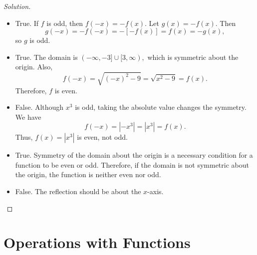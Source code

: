 \documentclass[12pt]{article}
\newenvironment{solution}{\begin{proof}[Solution]}{\end{proof}}
\begin{document}
\begin{enumerate}
\begin{solution}
\begin{itemize}
				\item[(d)] True. If $f$ is odd, then $f(-x)=-f(x)$. Let $g(x)=-f(x)$. Then
					$$g(-x)=-f(-x)=-[-f(x)]=f(x)=-g(x),	$$
					so $g$ is odd.
					
				\item[(e)] True. The domain is
					$(-\infty,-3]\cup[3,\infty),$
					which is symmetric about the origin. Also,
					$$f(-x)=\sqrt{(-x)^2-9}
					=\sqrt{x^2-9}
					=f(x).$$
					Therefore, $f$ is even.
					
				\item[(f)] False. Although $x^3$ is odd, taking the absolute value changes the symmetry. We have
					$$f(-x)=|-x^3|=|x^3|=f(x).$$
					Thus, $f(x)=|x^3|$ is even, not odd.
					
				\item[(g)] True. Symmetry of the domain about the origin is a necessary condition for a function to be even or odd. Therefore, if the domain is not symmetric about the origin, the function is neither even nor odd.
					
				\item[(h)] False. The reflection should be about the $x$-axis.
					
				
			\end{itemize}
		\end{solution}
	\end{enumerate}
	
	\newpage
	
		\section{Operations with Functions}
	
\end{document}
